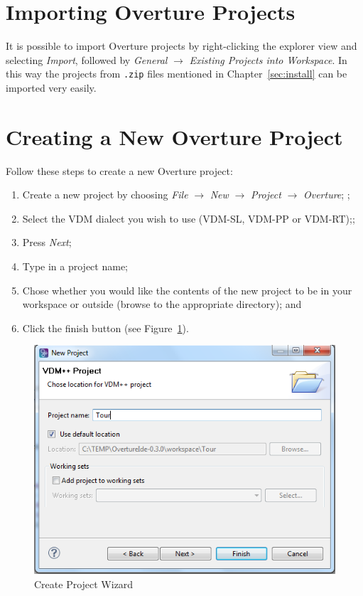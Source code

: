 \documentclass{overturerepchap}
\begin{document}
\section{Importing Overture Projects}\label{subsec:importproj}

It is possible to import Overture projects by
right-clicking the explorer view and selecting \emph{Import}, followed
by \emph{General} $\rightarrow$ \emph{Existing Projects into
  Workspace}.  In this way the projects from \texttt{.zip} files
mentioned in Chapter~\ref{sec:install} can be imported very
easily.  

\section{Creating a New Overture Project}

Follow these steps to create a new Overture project:

\begin{enumerate}
	\item Create a new project by choosing \emph{File}
          $\rightarrow$ \emph{New} $\rightarrow$ \emph{Project}
          $\rightarrow$ \emph{Overture}; ;
	\item Select the VDM dialect you wish to use (VDM-SL, VDM-PP
          or VDM-RT);;
	\item Press \emph{Next};
         \item Type in a project name;
	\item Chose whether you would like the contents of the new
          project to be in your workspace or outside
          (browse to the appropriate directory); and
    \item Click	the finish button (see Figure~\ref{fig:CreateProjectWizard}).
\end{enumerate}

\begin{figure}[!htb]
	\begin{center}
	  \includegraphics[scale=0.8]{figures/CreateProjectWizard}
	  \caption[Create Project Wizard]{Create Project Wizard}
	  \label{fig:CreateProjectWizard}
	\end{center}
\end{figure}
\end{document}
